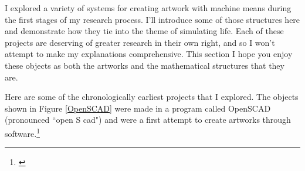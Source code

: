 \documentclass[12pt,twoside]{reedthesis}
\begin{document}
	I explored a variety of systems for creating artwork with machine means during the first stages of my research process. I'll introduce some of those structures here and demonstrate how they tie into the theme of simulating life. Each of these projects are deserving of greater research in their own right, and so I won't attempt to make my explanations comprehensive. This section I hope you enjoy these objects as both the artworks and the mathematical structures that they are.

	Here are some of the chronologically earliest projects that I explored. The objects shown in Figure \ref{OpenSCAD} were made in a program called OpenSCAD (pronounced ``open S cad") and were a first attempt to create artworks through software.\footnote{\cite{openSCAD}}\\
	
\end{document}
